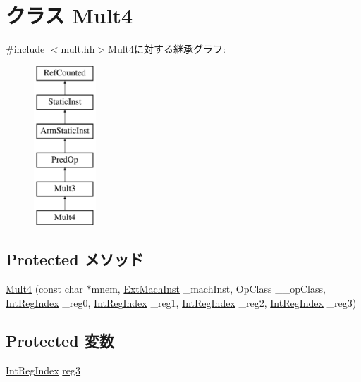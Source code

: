 \hypertarget{classArmISA_1_1Mult4}{
\section{クラス Mult4}
\label{classArmISA_1_1Mult4}
}


{\ttfamily \#include $<$mult.hh$>$}Mult4に対する継承グラフ:\begin{figure}[H]
\begin{center}
\leavevmode
\includegraphics[height=6cm]{classArmISA_1_1Mult4}
\end{center}
\end{figure}
\subsection*{Protected メソッド}
\begin{DoxyCompactItemize}
\item 
\hyperlink{classArmISA_1_1Mult4_a2ade733cf725f29f785fa4b93d0fcb3d}{Mult4} (const char $\ast$mnem, \hyperlink{classStaticInst_a5605d4fc727eae9e595325c90c0ec108}{ExtMachInst} \_\-machInst, OpClass \_\-\_\-opClass, \hyperlink{namespaceArmISA_ae64680ba9fb526106829d6bf92fc791b}{IntRegIndex} \_\-reg0, \hyperlink{namespaceArmISA_ae64680ba9fb526106829d6bf92fc791b}{IntRegIndex} \_\-reg1, \hyperlink{namespaceArmISA_ae64680ba9fb526106829d6bf92fc791b}{IntRegIndex} \_\-reg2, \hyperlink{namespaceArmISA_ae64680ba9fb526106829d6bf92fc791b}{IntRegIndex} \_\-reg3)
\end{DoxyCompactItemize}
\subsection*{Protected 変数}
\begin{DoxyCompactItemize}
\item 
\hyperlink{namespaceArmISA_ae64680ba9fb526106829d6bf92fc791b}{IntRegIndex} \hyperlink{classArmISA_1_1Mult4_a2f40b12134de4f3bab2811d743fa0c77}{reg3}
\end{DoxyCompactItemize}


